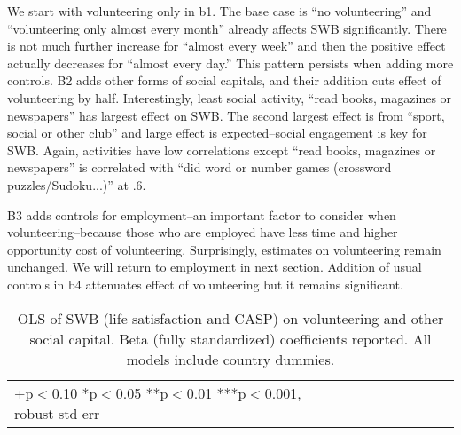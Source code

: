 \documentclass[10pt, letterpaper]{article}
\begin{document}
\begin{spacing}{1.4}
We start with  volunteering only in b1. The base case is ``no volunteering'' and
 ``volunteering only almost every month'' already affects SWB significantly. There is not
much further increase for ``almost every week'' and then the positive effect actually decreases for ``almost
every day.'' This pattern persists when adding more controls. B2 adds other forms
of social capitals, and their addition cuts effect of volunteering by half.
%
 Interestingly, least social activity,  ``read books, magazines or newspapers'' has 
largest effect on SWB. The second largest effect is from ``sport, social or other
club'' and large effect is
expected--social engagement is key for SWB. Again, activities have low
correlations except ``read books, magazines or newspapers'' is
correlated with ``did word or number games (crossword puzzles/Sudoku...)'' at
.6.



B3 adds  controls for employment--an important factor to consider when
volunteering--because those who are employed have less time and higher
opportunity cost of volunteering. Surprisingly, estimates on volunteering remain
unchanged. We will return to employment in next section.
Addition of usual controls in b4 attenuates effect of volunteering but it
remains significant.
 




\begin{spacing}{.9}
\begin{table}[H]\centering \caption{OLS of SWB (life satisfaction and CASP) on volunteering
    and other social capital. Beta (fully standardized) coefficients reported. All models
    include country dummies.}  \begin{scriptsize} \begin{tabular}{p{1.8in}p{.5in}p{.5in}p{.5in}p{.5in}|p{.5in}p{.5in}p{.5in}p{.5in}p{.5in}p{.4in}p{.5in}p{.4in}}\hline 
      \hline\multicolumn{5}{l}{+p$<$0.10 *p$<$0.05 **p$<$0.01 ***p$<$0.001,
        robust std err} \end{tabular}\label{regB} \end{scriptsize}\end{table}
\end{spacing}



\end{spacing}
\end{document}
